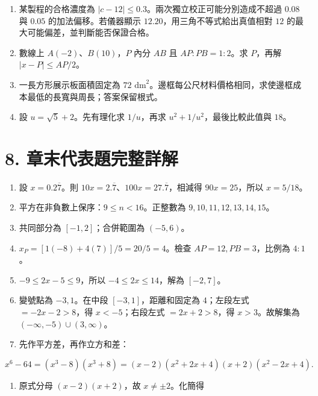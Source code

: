 \documentclass[11pt,a4paper]{article}
\providecommand{\tightlist}{%
  \setlength{\itemsep}{0pt}\setlength{\parskip}{0pt}}
\begin{document}
\begin{enumerate}
\def\labelenumi{\arabic{enumi}.}
\setcounter{enumi}{12}
\tightlist
\item
  某製程的合格濃度為 \(|c-12|\le0.3\)。兩次獨立校正可能分別造成不超過 \(0.08\) 與 \(0.05\) 的加法偏移。若儀器顯示 \(12.20\)，用三角不等式給出真值相對 \(12\) 的最大可能偏差，並判斷能否保證合格。
\item
  數線上 \(A(-2)\)、\(B(10)\)，\(P\) 內分 \(AB\) 且 \(AP:PB=1:2\)。求 \(P\)，再解 \(|x-P|\le AP/2\)。
\item
  一長方形展示板面積固定為 \(72\text{ dm}^2\)。邊框每公尺材料價格相同，求使邊框成本最低的長寬與周長；答案保留根式。
\item
  設 \(u=\sqrt5+2\)。先有理化求 \(1/u\)，再求 \(u^2+1/u^2\)，最後比較此值與 \(18\)。
\end{enumerate}

\section{8. 章末代表題完整詳解}\label{ux7ae0ux672bux4ee3ux8868ux984cux5b8cux6574ux8a73ux89e3}

\begin{enumerate}
\def\labelenumi{\arabic{enumi}.}
\item
  設 \(x=0.2\overline7\)。則 \(10x=2.\overline7\)、\(100x=27.\overline7\)，相減得 \(90x=25\)，所以 \(\boxed{x=5/18}\)。
\item
  平方在非負數上保序：\(9\le n<16\)。正整數為 \(\boxed{9,10,11,12,13,14,15}\)。
\item
  共同部分為 \(\boxed{[-1,2]}\)；合併範圍為 \(\boxed{(-5,6)}\)。
\item
  \(x_P=[1(-8)+4(7)]/5=20/5=\boxed4\)。檢查 \(AP=12,PB=3\)，比例為 \(4:1\)。
\item
  \(-9\le2x-5\le9\)，所以 \(-4\le2x\le14\)，解為 \(\boxed{[-2,7]}\)。
\item
  變號點為 \(-3,1\)。在中段 \([-3,1]\)，距離和固定為 \(4\)；左段左式 \(=-2x-2>8\)，得 \(x<-5\)；右段左式 \(=2x+2>8\)，得 \(x>3\)。故解集為 \(\boxed{(-\infty,-5)\cup(3,\infty)}\)。
\item
  先作平方差，再作立方和差：
\end{enumerate}

\[
x^6-64=(x^3-8)(x^3+8)
=(x-2)(x^2+2x+4)(x+2)(x^2-2x+4).
\]

\begin{enumerate}
\def\labelenumi{\arabic{enumi}.}
\setcounter{enumi}{7}
\tightlist
\item
  原式分母 \((x-2)(x+2)\)，故 \(x\ne\pm2\)。化簡得
\end{enumerate}
\end{document}

